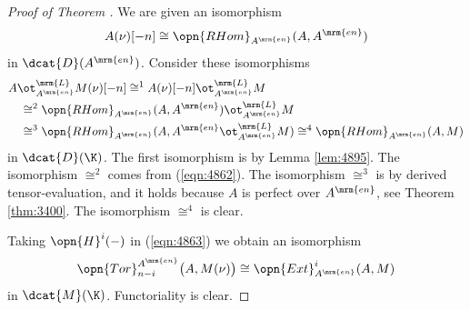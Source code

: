\begin{proof}[Proof of Theorem \tup{\ref{thm:4860}}]
We are given an isomorphism 
\begin{equation} \label{eqn:4862}
A(\nu)[-n] \cong 
\opn{RHom}_{A^{\mrm{en}}} (A, A^{\mrm{en}})
\end{equation}
in $\dcat{D}(A^{\mrm{en}})$.
Consider these isomorphisms
\begin{equation} \label{eqn:4863}
\begin{aligned}
& A \ot^{\mrm{L}}_{A^{\mrm{en}}} M(\nu)[-n] \cong^{1} 
A(\nu)[-n] \ot^{\mrm{L}}_{A^{\mrm{en}}} M 
\\ & \quad 
\cong^{2} \opn{RHom}_{A^{\mrm{en}}} (A, A^{\mrm{en}}) 
\ot^{\mrm{L}}_{A^{\mrm{en}}} M
\\ & \quad 
\cong^{3} \opn{RHom}_{A^{\mrm{en}}} (A, A^{\mrm{en}}
\ot^{\mrm{L}}_{A^{\mrm{en}}} M)
\cong^4 \opn{RHom}_{A^{\mrm{en}}} (A, M)
\end{aligned}
\end{equation}
in $\dcat{D}(\K)$.
The first isomorphism is by Lemma \ref{lem:4895}.
The isomorphism $\cong^{2}$ comes from (\ref{eqn:4862}). 
The isomorphism $\cong^{3}$ is by derived tensor-evaluation, and it holds 
because $A$ is perfect over $A^{\mrm{en}}$, see Theorem 
\ref{thm:3400}. The isomorphism $\cong^4$ is clear. 

Taking $\opn{H}^i(-)$ in (\ref{eqn:4863}) we obtain an isomorphism 
\[ \opn{Tor}_{n - i}^{A^{\mrm{en}}} \bigl( A, M(\nu) \bigr) \cong 
\opn{Ext}^i_{A^{\mrm{en}}} (A, M) \]
in $\dcat{M}(\K)$. Functoriality is clear. 
\end{proof}

